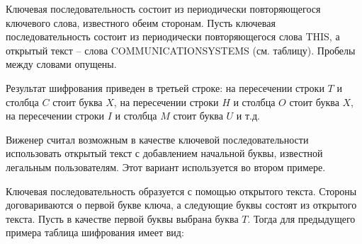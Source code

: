 \example
Ключевая последовательность состоит из периодически повторяющегося ключевого слова, известного обеим сторонам. Пусть ключевая последовательность состоит из периодически повторяющегося слова THIS, а открытый текст -- слова COMMUNICATIONSYSTEMS (см. таблицу). Пробелы между словами опущены.
\begin{center}  \end{center}
Результат шифрования приведен в третьей строке: на пересечении строки $T$ и столбца $C$ стоит буква $X$, на пересечении строки $H$ и столбца $O$ стоит буква $X$, на пересечении строки $I$ и столбца  $M$ стоит буква $U$ и т.д.
\exampleend

Виженер считал возможным в качестве ключевой последовательности использовать открытый текст с добавлением начальной буквы, известной легальным пользователям. Этот вариант используется во втором примере.

\example
Ключевая последовательность образуется с помощью открытого текста. Стороны договариваются о первой букве ключа, а следующие буквы состоят из открытого текста. Пусть в качестве первой буквы выбрана буква  $T$. Тогда для предыдущего примера таблица шифрования имеет вид:
\begin{center}  \end{center}
\exampleend

